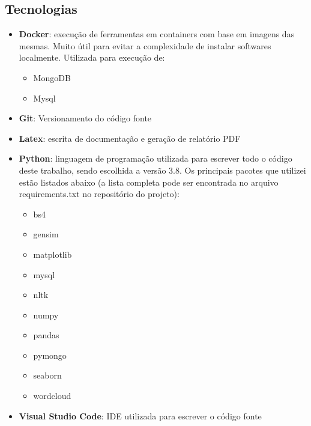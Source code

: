 \subsection{Tecnologias}

\begin{itemize}
    \item \textbf{Docker}: execução de ferramentas em containers com base em imagens das mesmas. Muito útil para evitar a complexidade de instalar softwares 
    localmente. Utilizada para execução de:
        \begin{itemize}
            \item MongoDB
            \item Mysql
        \end{itemize}
    \item \textbf{Git}: Versionamento do código fonte
    \item \textbf{Latex}: escrita de documentação e geração de relatório PDF
    \item \textbf{Python}: linguagem de programação utilizada para escrever todo o código deste trabalho, sendo escolhida a versão 3.8. Os principais pacotes que 
    utilizei estão listados abaixo (a lista completa pode ser encontrada no arquivo requirements.txt no repositório do projeto):
        \begin{itemize}
            \item bs4
            \item gensim
            \item matplotlib
            \item mysql
            \item nltk
            \item numpy
            \item pandas
            \item pymongo
            \item seaborn
            \item wordcloud
        \end{itemize}
    \item \textbf{Visual Studio Code}: IDE utilizada para escrever o código fonte 
\end{itemize}
